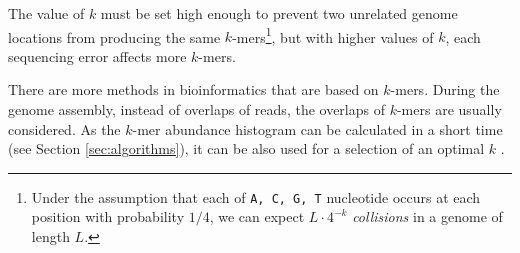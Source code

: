 The value of $k$ must be set high enough to prevent two unrelated genome locations from producing the same $k$-mers\footnote{Under
the assumption that each of \texttt{A, C, G, T} nucleotide occurs at each position with probability $1/4$, we can expect
$L \cdot 4^{-k}$ \textit{collisions} in a genome of length $L$.}, but with higher values of $k$, each sequencing error affects more $k$-mers.

\medskip

There are more methods in bioinformatics that are based on $k$-mers. During the genome assembly, instead of overlaps of reads, the overlaps of $k$-mers are usually
considered. As the $k$-mer abundance histogram can be calculated in a short time (see Section \ref{sec:algorithms}), it can be also used for
a selection of an optimal $k$ \cite{Chikhi2013}.
